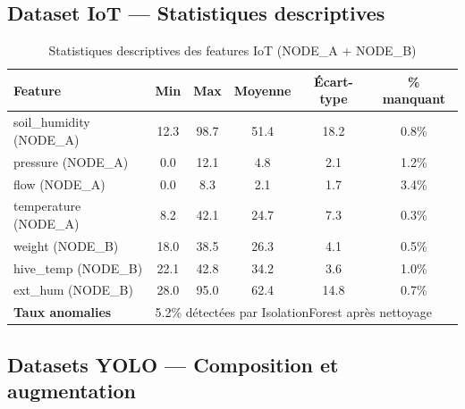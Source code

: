 \subsection{Dataset IoT — Statistiques descriptives}

\begin{table}[H]\centering
\caption{Statistiques descriptives des features IoT (NODE\_A + NODE\_B)}
\label{tab:eda_iot}
\small
\begin{tabular}{lccccc}
\toprule
\textbf{Feature} & \textbf{Min} & \textbf{Max} & \textbf{Moyenne} & \textbf{Écart-type} & \textbf{\% manquant} \\
\midrule
soil\_humidity (NODE\_A) & 12.3 & 98.7 & 51.4 & 18.2 & 0.8\% \\
pressure (NODE\_A)       & 0.0  & 12.1 & 4.8  & 2.1  & 1.2\% \\
flow (NODE\_A)           & 0.0  & 8.3  & 2.1  & 1.7  & 3.4\% \\
temperature (NODE\_A)    & 8.2  & 42.1 & 24.7 & 7.3  & 0.3\% \\
weight (NODE\_B)         & 18.0 & 38.5 & 26.3 & 4.1  & 0.5\% \\
hive\_temp (NODE\_B)     & 22.1 & 42.8 & 34.2 & 3.6  & 1.0\% \\
ext\_hum (NODE\_B)       & 28.0 & 95.0 & 62.4 & 14.8 & 0.7\% \\
\midrule
\textbf{Taux anomalies} & \multicolumn{5}{l}{5.2\% détectées par IsolationForest après nettoyage} \\
\bottomrule
\end{tabular}
\end{table}

\subsection{Datasets YOLO — Composition et augmentation}

